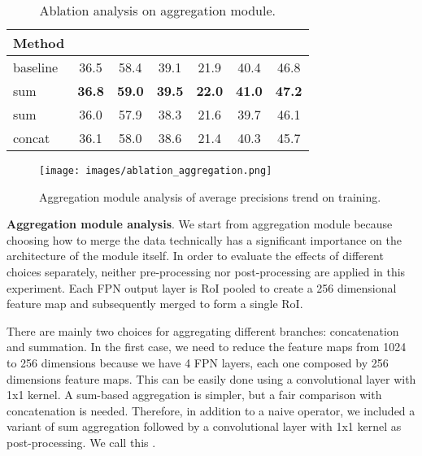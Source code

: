 \documentclass[10pt,conference,a4paper]{IEEEtran}
\begin{document}
\begin{table}
  \begin{center}
    \begin{tabular}{l|c|c|c|c|c|c}
      Method &  &  &  &  &  &  \\
      \hline\hline
      baseline   & 36.5 & 58.4 & 39.1 & 21.9 & 40.4 & 46.8 \\
sum        & \textbf{36.8} & \textbf{59.0} & \textbf{39.5} & \textbf{22.0} & \textbf{41.0} & \textbf{47.2} \\
sum     & 36.0 & 57.9 & 38.3 & 21.6 & 39.7 & 46.1 \\
concat     & 36.1 & 58.0 & 38.6 & 21.4 & 40.3 & 45.7 \\
    \end{tabular}
  \end{center}
  \caption{Ablation analysis on aggregation module.}
  \label{ablation-aggregation}
\end{table}

\begin{figure}[t]
  \begin{center}
    \texttt{[image: images/ablation\_aggregation.png]}
  \end{center}
  \caption{Aggregation module analysis of average precisions trend on training.}
  \label{fig:ablation_aggregation}
\end{figure}

\noindent\textbf{Aggregation module analysis}.
We start from aggregation module because choosing how to merge the data technically has a significant importance on the architecture of the module itself.
In order to evaluate the effects of different choices separately, neither pre-processing nor post-processing are applied in this experiment.
Each FPN output layer is RoI pooled to create a 256 dimensional feature map and subsequently merged to form a single RoI.

There are mainly two choices for aggregating different branches: concatenation and summation.
In the first case, we need to reduce the feature maps from 1024 to 256 dimensions because we have 4 FPN layers, each one composed by 256 dimensions feature maps.
This can be easily done using a convolutional layer with 1x1 kernel.
A sum-based aggregation is simpler, but a fair comparison with concatenation is needed.
Therefore, in addition to a naive  operator, we included a variant of sum aggregation followed by a convolutional layer with 1x1 kernel as post-processing.
We call this .
\end{document}
